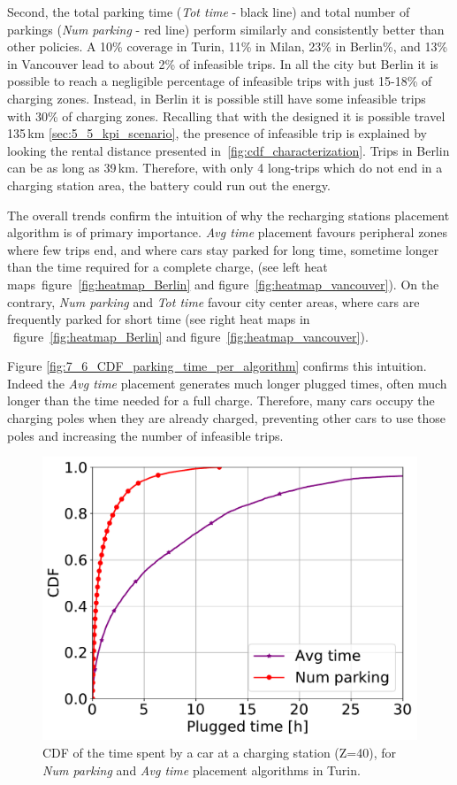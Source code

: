 Second, the total parking time  (\textit{Tot time} - black line) and total number of parkings (\textit{Num parking} - red line) perform similarly and consistently better than other policies. A 10\% coverage in Turin, 11\% in Milan, 23\% in Berlin\%, and 13\% in Vancouver lead to about 2\% of infeasible trips. 
In all the city but Berlin it is possible to reach a negligible percentage of infeasible trips with just 15-18\% of charging zones. Instead, in Berlin it is possible still have some infeasible trips with 30\% of charging zones. Recalling that with the designed it is possible travel 135\,km \ref{sec:5_5_kpi_scenario}, the presence of infeasible trip is explained by looking the rental distance presented in~\ref{fig:cdf_characterization}. Trips in Berlin can be as long as 39\,km. Therefore, with only 4 long-trips which do not end in a charging station area, the battery could run out the energy.

The overall trends confirm the intuition of why the recharging stations placement algorithm is of primary importance. \textit{Avg time} placement favours peripheral zones where few trips end, and where cars stay parked for long time, sometime longer than the time required for a complete charge, (see left heat maps~figure~\ref{fig:heatmap_Berlin} and figure~\ref{fig:heatmap_vancouver}). On the contrary, \textit{Num parking} and \textit{Tot time} favour city center areas, where cars are frequently parked for short time (see right heat maps in ~figure~\ref{fig:heatmap_Berlin} and figure~\ref{fig:heatmap_vancouver}). 

Figure \ref{fig:7_6_CDF_parking_time_per_algorithm} confirms this intuition. Indeed the \textit{Avg time} placement generates much longer plugged times, often much longer than the time needed for a full charge. Therefore, many cars occupy the charging poles when they are already charged, preventing other cars to use those poles and increasing the number of infeasible trips. 

\begin{figure}[ht]
	\centering
	\includegraphics[width=0.5\columnwidth]{figures/CDF_parking_time_per_algorithm.pdf}
	\caption{CDF of the time spent by a car at a charging station (Z=40), for \textit{Num parking} and \textit{Avg time} placement algorithms in Turin. }
	\label{fig:6_6_CDF_parking_time_per_algorithm}
\end{figure}



